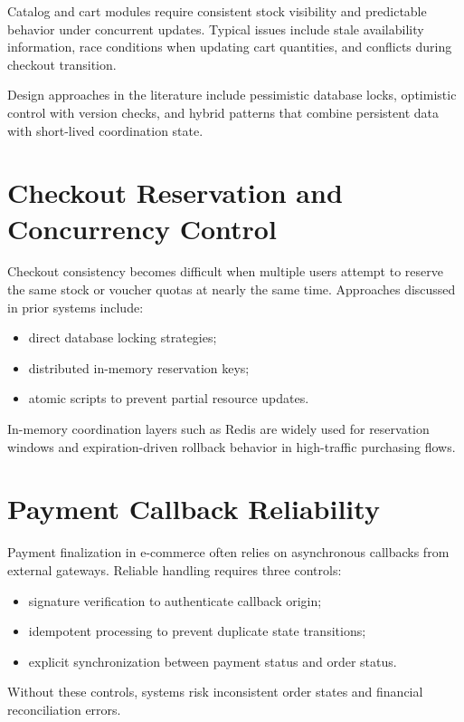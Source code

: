 Catalog and cart modules require consistent stock visibility and predictable behavior under concurrent updates. Typical issues include stale availability information, race conditions when updating cart quantities, and conflicts during checkout transition.

Design approaches in the literature include pessimistic database locks, optimistic control with version checks, and hybrid patterns that combine persistent data with short-lived coordination state.

\section{Checkout Reservation and Concurrency Control}

Checkout consistency becomes difficult when multiple users attempt to reserve the same stock or voucher quotas at nearly the same time. Approaches discussed in prior systems include:
\begin{itemize}
    \item direct database locking strategies;
    \item distributed in-memory reservation keys;
    \item atomic scripts to prevent partial resource updates.
\end{itemize}

In-memory coordination layers such as Redis are widely used for reservation windows and expiration-driven rollback behavior in high-traffic purchasing flows.

\section{Payment Callback Reliability}

Payment finalization in e-commerce often relies on asynchronous callbacks from external gateways. Reliable handling requires three controls:
\begin{itemize}
    \item signature verification to authenticate callback origin;
    \item idempotent processing to prevent duplicate state transitions;
    \item explicit synchronization between payment status and order status.
\end{itemize}

Without these controls, systems risk inconsistent order states and financial reconciliation errors.

